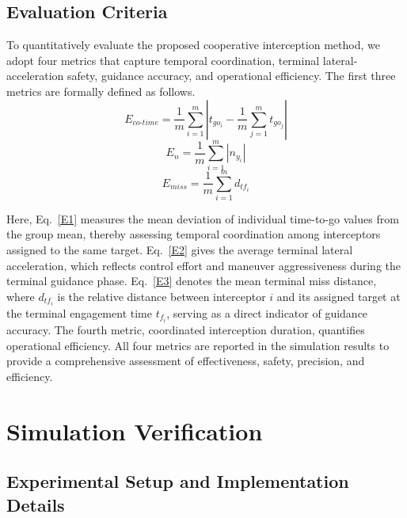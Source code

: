 \documentclass[lettersize,journal]{IEEEtran}
\newcommand{\hladd}[1]{{\color{blue}#1}}
\begin{document}
\subsection{Evaluation Criteria}
\label{subsec:eval}

To quantitatively evaluate the proposed cooperative interception method, we adopt four metrics that capture temporal coordination, \hladd{terminal lateral-acceleration safety}, guidance accuracy, and operational efficiency. The first three metrics are formally defined as follows.
\begin{equation}
\label{E1}
E_{co\text{-}time} = \frac{1}{m}\sum_{i=1}^{m} \left| t_{go_i} - \frac{1}{m}\sum_{j=1}^{m} t_{go_j} \right|
\end{equation}
\begin{equation}
\label{E2}
E_{n} = \frac{1}{m}\sum_{i=1}^{m} |n_{y_i}|
\end{equation}
\begin{equation}
\label{E3}
E_{miss} = \frac{1}{m}\sum_{i=1}^{m} d_{tf_i}
\end{equation}

Here, Eq.~\eqref{E1} measures the mean deviation of individual time-to-go values from the group mean, thereby assessing temporal coordination among interceptors assigned to the same target. Eq.~\eqref{E2} gives the \hladd{average terminal lateral acceleration}, which reflects control effort and maneuver aggressiveness during the terminal guidance phase. Eq.~\eqref{E3} denotes the mean terminal miss distance, where $d_{tf_i}$ is the relative distance between interceptor $i$ and its assigned target at the terminal engagement time $t_{f_i}$, serving as a direct indicator of guidance accuracy. The fourth metric, coordinated interception duration, quantifies operational efficiency. All four metrics are reported in the simulation results to provide a comprehensive assessment of effectiveness, safety, precision, and efficiency.










\section{Simulation Verification}
\label{sec:simulation}

\subsection{Experimental Setup and Implementation Details}
\label{subsec:setup}
\end{document}
